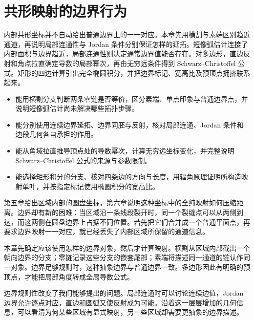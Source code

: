 \chapter{共形映射的边界行为}
\label{b3:ch:07}
\begin{chapterabstract}
内部共形坐标并不自动给出普通边界上的一一对应。本章先用横割与素端区别趋近通道，再说明局部连通性与 Jordan 条件分别保证怎样的延拓。短像弧估计连接了内部面积与边界趋近，局部连通性则决定通常边界值能否存在。对多边形，直边反射和角点拉直确定导数的局部幂次，再由无穷远条件得到 Schwarz--Christoffel 公式。矩形的四边计算引出完全椭圆积分，并把边界标记、宽高比及预顶点拥挤联系起来。
\end{chapterabstract}

\begin{learninggoals}
\begin{itemize}
\item\label{b3:item:07-goal-1}能用横割分支判断两条零链是否等价，区分素端、单点印象与普通边界点，并说明短像弧估计尚未解决哪些拓扑步骤。
\item\label{b3:item:07-goal-2}能分别使用连续边界延拓、边界同胚与反射，核对局部连通、Jordan 条件和边段几何各自承担的作用。
\item\label{b3:item:07-goal-3}能从角域拉直推导顶点处的导数幂次，计算无穷远坐标变化，并完整说明 Schwarz--Christoffel 公式的来源与参数限制。
\item\label{b3:item:07-goal-4}能选择矩形积分的分支、核对四条边的方向与长度，用辐角原理证明所构造映射单叶，并按指定标记使用椭圆积分的宽高比。
\end{itemize}
\end{learninggoals}

第五章给出区域内部的圆盘坐标，第六章说明这种坐标中的全纯映射如何压缩距离。边界却有新的困难：当区域沿一条线段裂开时，同一个裂缝点可以从两侧到达，而这两侧在圆盘边界上占据不同位置。若先把它们合并成一个普通平面点，再要求边界映射一一对应，就已经丢失了内部区域所保留的通道信息。

\ProseParagraphBreak

本章先确定应该使用怎样的边界对象，然后才计算映射。横割从区域内部截出一个朝向边界的分支；零链记录这些分支的嵌套尾部；素端将描述同一通道的链认作同一对象。边界足够规则时，这种抽象边界与普通边界一致。多边形因此有明确的预顶点，才能把局部角度转成全局导数公式。

\ProseParagraphBreak

边界规则性改变了我们能够提出的问题。局部连通时可以讨论连续边值，Jordan 边界允许逐点对应，直边和圆弧又使反射成为可能。沿着这一层层增加的几何信息，可以看清为何某些区域有显式映射，另一些区域却需要更抽象的边界描述。

